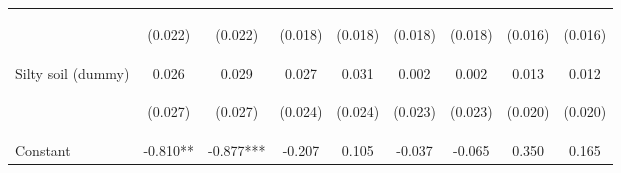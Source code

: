 \begin{center}
\begin{tabular}{lcccccccc}
\vspace{4pt} & \begin{footnotesize}(0.022)\end{footnotesize} & \begin{footnotesize}(0.022)\end{footnotesize} & \begin{footnotesize}(0.018)\end{footnotesize} & \begin{footnotesize}(0.018)\end{footnotesize} & \begin{footnotesize}(0.018)\end{footnotesize} & \begin{footnotesize}(0.018)\end{footnotesize} & \begin{footnotesize}(0.016)\end{footnotesize} & \begin{footnotesize}(0.016)\end{footnotesize} \\
Silty soil (dummy) & 0.026 & 0.029 & 0.027 & 0.031 & 0.002 & 0.002 & 0.013 & 0.012 \\
\vspace{4pt} & \begin{footnotesize}(0.027)\end{footnotesize} & \begin{footnotesize}(0.027)\end{footnotesize} & \begin{footnotesize}(0.024)\end{footnotesize} & \begin{footnotesize}(0.024)\end{footnotesize} & \begin{footnotesize}(0.023)\end{footnotesize} & \begin{footnotesize}(0.023)\end{footnotesize} & \begin{footnotesize}(0.020)\end{footnotesize} & \begin{footnotesize}(0.020)\end{footnotesize} \\
Constant & -0.810** & -0.877*** & -0.207 & 0.105 & -0.037 & -0.065 & 0.350 & 0.165 \\

\end{tabular}
\end{center}
